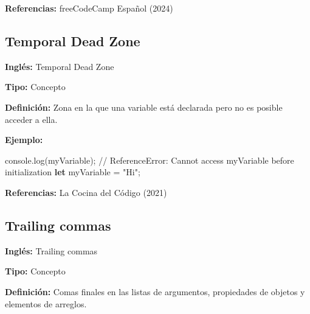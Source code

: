 \documentclass[
  letterpaper,
  DIV=11,
  numbers=noendperiod]{scrreprt}
\newenvironment{Shaded}{\begin{snugshade}}{\end{snugshade}}
\newcommand{\BuiltInTok}[1]{\textcolor[rgb]{0.00,0.23,0.31}{#1}}
\newcommand{\CommentTok}[1]{\textcolor[rgb]{0.37,0.37,0.37}{#1}}
\newcommand{\FunctionTok}[1]{\textcolor[rgb]{0.28,0.35,0.67}{#1}}
\newcommand{\KeywordTok}[1]{\textcolor[rgb]{0.00,0.23,0.31}{\textbf{#1}}}
\newcommand{\NormalTok}[1]{\textcolor[rgb]{0.00,0.23,0.31}{#1}}
\newcommand{\OperatorTok}[1]{\textcolor[rgb]{0.37,0.37,0.37}{#1}}
\newcommand{\SpecialCharTok}[1]{\textcolor[rgb]{0.37,0.37,0.37}{#1}}
\newcommand{\StringTok}[1]{\textcolor[rgb]{0.13,0.47,0.30}{#1}}
\newcommand{\VerbatimStringTok}[1]{\textcolor[rgb]{0.13,0.47,0.30}{#1}}
\let\oldsubsection\subsection
\renewcommand{\subsection}{\phantomsection\oldsubsection}
\begin{document}
\begin{Shaded}
\end{Shaded}

\textbf{Referencias:} freeCodeCamp Español (2024)

\subsection*{Temporal Dead Zone}\label{glos-temporal_dead_zone}

\textbf{Inglés:} Temporal Dead Zone

\textbf{Tipo:} Concepto

\textbf{Definición:} Zona en la que una variable está declarada pero no
es posible acceder a ella.

\textbf{Ejemplo:}

\begin{Shaded}
\begin{Highlighting}[]
\BuiltInTok{console}\OperatorTok{.}\FunctionTok{log}\NormalTok{(myVariable)}\OperatorTok{;} 
\CommentTok{// ReferenceError: Cannot access \textquotesingle{}myVariable\textquotesingle{} before initialization}
\KeywordTok{let}\NormalTok{ myVariable }\OperatorTok{=} \StringTok{"Hi"}\OperatorTok{;}
\end{Highlighting}
\end{Shaded}

\textbf{Referencias:} La Cocina del Código (2021)

\subsection*{Trailing commas}\label{glos-trailing_commas}

\textbf{Inglés:} Trailing commas

\textbf{Tipo:} Concepto

\textbf{Definición:} Comas finales en las listas de argumentos,
propiedades de objetos y elementos de arreglos.
\end{document}
